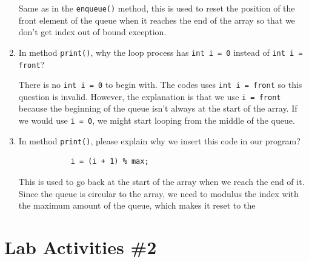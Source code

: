 \documentclass[12pt,titlepage]{article}
\begin{document}
\begin{enumerate}
{        Same as in the \texttt{enqueue()} method, this is used to reset the position of the front element of the queue
        when it reaches the end of the array so that we don't get index out of bound exception.
    }
    \item {
        In method \texttt{print()}, why the loop process has \texttt{int i = 0} instead of \texttt{int i = front}?

        There is no \texttt{int i = 0} to begin with. The codes uses \texttt{int i = front} so this question is invalid.
        However, the explanation is that we use \texttt{i = front} because the beginning of the queue isn't always at the start of the array.
        If we would use \texttt{i = 0}, we might start looping from the middle of the queue.
    }
    \item {
        In method \texttt{print()}, please explain why we insert this code in our program?
        
        \begin{verbatim}
            i = (i + 1) % max;
        \end{verbatim}

        This is used to go back at the start of the array when we reach the end of it. Since the queue is circular to the array,
        we need to modulus the index with the maximum amount of the queue, which makes it reset to the 
    }
\end{enumerate}

\section*{Lab Activities \#2}
\end{document}
